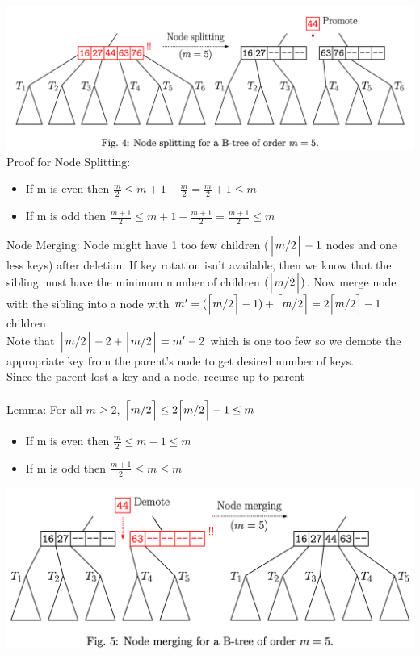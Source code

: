 \documentclass{article}
\DeclarePairedDelimiter{\ceil}{\lceil}{\rceil}
\begin{document}
  \includegraphics[width=\textwidth]{BTreeNodeSplitting}
  Proof for Node Splitting:
  \begin{itemize}[noitemsep]
  \item If m is even then $\frac{m}{2} \leq m + 1 - \frac{m}{2} = \frac{m}{2} + 1 \leq m$
  \item If m is odd then $\frac{m+1}{2} \leq m + 1 - \frac{m+1}{2} = \frac{m+1}{2} \leq m$ \\
  \end{itemize}
  Node Merging: Node might have 1 too few children ($\ceil[\Big]{m/2} - 1$ nodes and one less keys) after deletion. If key rotation isn't available, then we know that the sibling must have the minimum number of children $(\ceil[\Big]{m/2})$. Now merge node with the sibling into a node with $m' = (\ceil[\Big]{m/2} - 1) + \ceil[\Big]{m/2} = 2\ceil[\Big]{m/2} - 1$ children\\
  Note that $\ceil[\Big]{m/2} - 2 + \ceil[\Big]{m/2} = m' - 2$ which is one too few so we demote the appropriate key from the parent's node to get desired number of keys. \\
  Since the parent lost a key and a node, recurse up to parent\\ \\
  Lemma: For all $m \geq 2$, $\ceil[\Big]{m/2} \leq 2\ceil[\Big]{m/2} - 1 \leq m$
  \begin{itemize}[noitemsep]
  \item If m is even then $\frac{m}{2} \leq m - 1 \leq m$
  \item If m is odd then $\frac{m+1}{2} \leq m \leq m$
  \end{itemize}
  \includegraphics[width=\textwidth]{BtreeNodeMerge}
\end{document}
